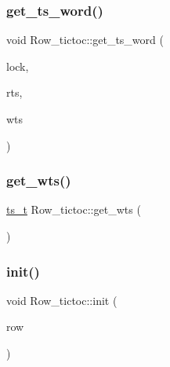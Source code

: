\mbox{\label{classRow__tictoc_a7e83376689a8f6504419779ee7348dee}} 
\subsubsection{\texorpdfstring{get\+\_\+ts\+\_\+word()}{get\_ts\_word()}}
{\footnotesize\ttfamily void Row\+\_\+tictoc\+::get\+\_\+ts\+\_\+word (\begin{DoxyParamCaption}\item[{bool \&}]{lock,  }\item[{uint64\+\_\+t \&}]{rts,  }\item[{uint64\+\_\+t \&}]{wts }\end{DoxyParamCaption})}

\mbox{\label{classRow__tictoc_a8e4797ac556c6ebf9b58d986dbbea0ac}} 
\subsubsection{\texorpdfstring{get\+\_\+wts()}{get\_wts()}}
{\footnotesize\ttfamily \hyperlink{global_8h_aaf095dfc9b10f757c968fe146ad7e724}{ts\+\_\+t} Row\+\_\+tictoc\+::get\+\_\+wts (\begin{DoxyParamCaption}{ }\end{DoxyParamCaption})}

\mbox{\label{classRow__tictoc_a44d46cc09bdf8f078f992075a2e126c9}} 
\subsubsection{\texorpdfstring{init()}{init()}}
{\footnotesize\ttfamily void Row\+\_\+tictoc\+::init (\begin{DoxyParamCaption}\item[{\hyperlink{classrow__t}{row\+\_\+t} $\ast$}]{row }\end{DoxyParamCaption})}

\mbox{\label{classRow__tictoc_a534c6fe17f2cf8fffc7a1b06eef67b03}} 
